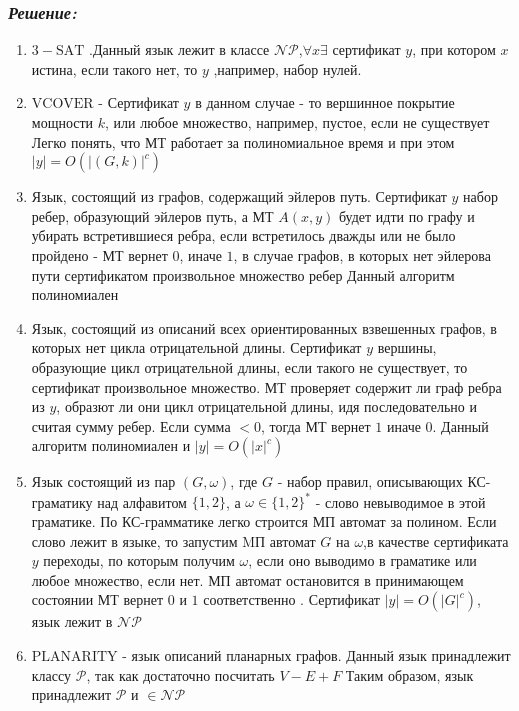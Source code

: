 \documentclass[a4paper, 11pt]{article} %
\begin{document}
\subsubsection*{\textit{Решение:}}
\begin{enumerate}

 \item $\mathrm{3-SAT}$ .Данный язык лежит в классе $\mathcal{NP}$,$\forall x\exists $ сертификат $y$, при котором $x$ истина, если такого нет, то $y$ ,например, набор нулей. 
 
 \item $\mathrm{VCOVER}$ - Сертификат $y$ в данном случае - то вершинное покрытие мощности $k$, или любое множество, например, пустое, если не существует  Легко понять, что МТ работает за полиномиальное время и при этом $|y| = O(|(G,k)| ^ {c})$ 

 \item Язык, состоящий из графов, содержащий эйлеров путь.  Сертификат $y$ набор ребер, образующий эйлеров путь, а МТ $A(x, y)$ будет идти по графу и убирать встретившиеся ребра, если встретилось дважды или не было пройдено - МТ вернет $0$, иначе $1$, в случае графов, в которых нет эйлерова пути сертификатом произвольное множество ребер
Данный алгоритм полиномиален

 \item Язык, состоящий из описаний всех ориентированных взвешенных графов, в которых нет цикла отрицательной длины. Сертификат $y$  вершины, образующие цикл отрицательной длины, если такого не существует, то сертификат произвольное множество. МТ проверяет содержит ли граф ребра из $y$, образют ли они цикл отрицательной длины, идя последовательно и считая сумму ребер. Если сумма $< 0$, тогда МТ вернет $1$ иначе $0$. Данный алгоритм полиномиален и $|y| = O(|x|^{c})$
 
 \item Язык состоящий из пар $(G, \omega)$, где $G$ - набор правил, описывающих КС-граматику над алфавитом $\{1, 2\}$, а $\omega \in \{1,2\}^*$ - слово невыводимое в этой граматике. По КС-грамматике легко строится МП автомат за полином. Если слово лежит в языке, то запустим MП автомат $G$ на $\omega$,в качестве сертификата $y$  переходы, по которым получим $\omega$, если оно выводимо в граматике или любое множество, если нет. МП автомат остановится в принимающем состоянии МТ вернет $0$ и $1$ соответственно  . Сертификат $|y| = O(|G|^{c})$, язык лежит в $\mathcal{NP}$
 
 \item $\mathrm{PLANARITY}$ - язык описаний планарных графов. Данный язык принадлежит классу $\mathcal{P}$, так как достаточно посчитать $V - E + F$ Таким образом, язык принадлежит $\mathcal{P}$ и $\in \mathcal{NP}$
\end{enumerate}
\end{document}

